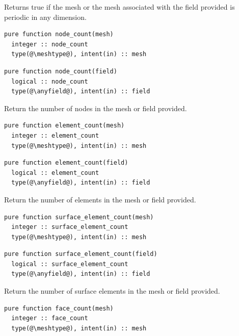 \documentclass[a4paper, 11pt]{book}
\begin{document}
Returns true if the mesh or the mesh associated with the field provided is
periodic in any dimension.


\begin{lstlisting}
pure function node_count(mesh)
  integer :: node_count
  type(@\meshtype@), intent(in) :: mesh
\end{lstlisting}

\begin{lstlisting}
pure function node_count(field)
  logical :: node_count
  type(@\anyfield@), intent(in) :: field
\end{lstlisting}

Return the number of nodes in the mesh or field provided.


\begin{lstlisting}
pure function element_count(mesh)
  integer :: element_count
  type(@\meshtype@), intent(in) :: mesh
\end{lstlisting}

\begin{lstlisting}
pure function element_count(field)
  logical :: element_count
  type(@\anyfield@), intent(in) :: field
\end{lstlisting}

Return the number of elements in the mesh or field provided.


\begin{lstlisting}
pure function surface_element_count(mesh)
  integer :: surface_element_count
  type(@\meshtype@), intent(in) :: mesh
\end{lstlisting}

\begin{lstlisting}
pure function surface_element_count(field)
  logical :: surface_element_count
  type(@\anyfield@), intent(in) :: field
\end{lstlisting}

Return the number of surface elements in the mesh or field provided.


\begin{lstlisting}
pure function face_count(mesh)
  integer :: face_count
  type(@\meshtype@), intent(in) :: mesh
\end{lstlisting}
\end{document}
